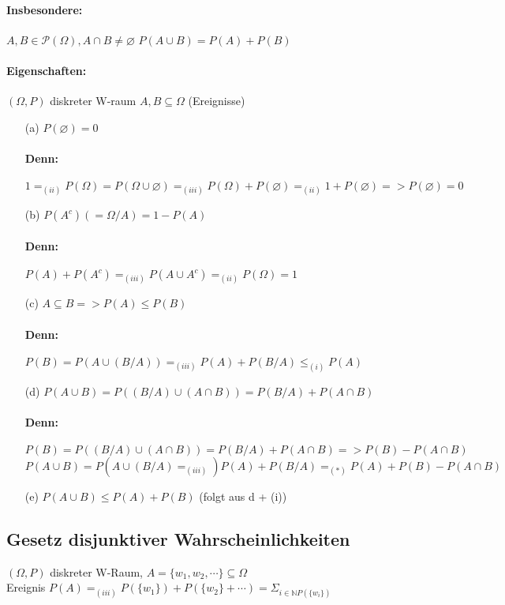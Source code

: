 \documentclass{article}
\begin{document}
\paragraph*{Insbesondere:} \(A, B \in \mathcal{P}(\Omega), A \cap B \not = \varnothing\) \(P(A \cup B) = P(A) + P(B)\)
\paragraph{Eigenschaften:} \((\Omega, P)\) diskreter W-raum \(A, B \subseteq \Omega\) (Ereignisse)
\begin{itemize}
    \item [(a)] \(P(\varnothing) = 0\) \paragraph*{Denn: } \(1 =_{(ii)} P(\Omega) = P(\Omega \cup \varnothing) =_{(iii)} P(\Omega) + P(\varnothing) =_{(ii)} 1 + P(\varnothing) => P(\varnothing) = 0 \)
    \item [(b)] \(P(A^c)(=\Omega/A) = 1 - P(A)\) \paragraph*{Denn:} \(P(A) + P(A^c) =_{(iii)} P(A \cup A^c) =_{(ii)} P(\Omega) = 1\)
    \item [(c)] \(A \subseteq B => P(A) \leq P(B)\) \paragraph*{Denn: } \(P(B) = P(A \cup (B/A)) =_{(iii)} P(A)+P(B/A) \leq_{(i)} P(A)\)
    \item [(d)] \(P(A \cup B) = P((B/A) \cup (A\cap B)) = P(B/A) + P(A\cap B)\) \paragraph*{Denn:} \(P(B) = P((B/A) \cup (A \cap B)) = P(B/A) + P(A \cap B) => P(B) - P(A\cap B)\) \\ \(P(A\cup B) = P(A \cup (B/A) =_{(iii)}) P(A) + P(B/A) =_{(*)} P(A) + P(B) - P(A \cap B)\)
    \item [(e)] \(P(A \cup B) \leq P(A) + P(B)\) (folgt aus d + (i))
\end{itemize}

\subsection*{Gesetz disjunktiver Wahrscheinlichkeiten}
\((\Omega, P)\) diskreter W-Raum, \(A = \{w_1, w_2, \cdots\} \subseteq \Omega\) \\ Ereignis \(P(A) =_{(iii)} P(\{w_1\}) + P(\{w_2\}+ \cdots) = \Sigma_{i \in \mathbb{N} P(\{w_i\})}\)
\end{document}

